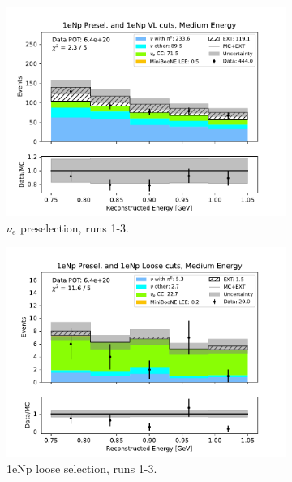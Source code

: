 \begin{figure}[H]
    \centering
    \begin{subfigure}{0.33\linewidth}
        \includegraphics[width=\linewidth]{technote/Sidebands/Figures/NearSideband/near_sideband_reco_e_run123_NP_NP_MEDIUM_ENERGY.pdf}
        \caption{$\nu_e$ preselection, runs 1-3.}
    \end{subfigure}%
    \begin{subfigure}{0.33\linewidth}
        \includegraphics[width=\linewidth]{technote/Sidebands/Figures/NearSideband/near_sideband_reco_e_run123_NP_NPL_MEDIUM_ENERGY.pdf}
        \caption{1eNp loose selection, runs 1-3.}
    \end{subfigure}%
    \begin{subfigure}{0.33\linewidth}

\end{subfigure}
\end{figure}
